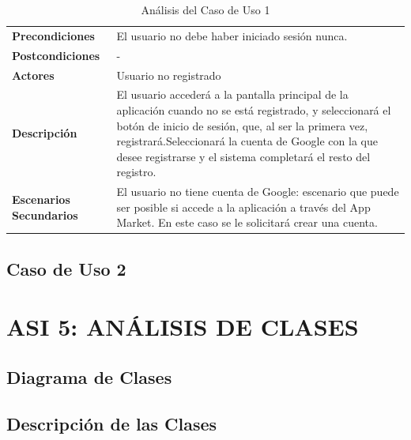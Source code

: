 \documentclass[11pt]{report}
\begin{document}
\begin{table}[H]
  \centering
  \vspace{-5mm}
  \caption{Análisis del Caso de Uso 1}
    \begin{tabular}{p{7.5em}p{24.145em}}
    \toprule
    \rowcolor[rgb]{ .871,  .918,  .965} \multicolumn{2}{p{31.645em}}{\textbf{Registro}} \\
    \midrule
    \rowcolor[rgb]{ .906,  .902,  .902} \textbf{Precondiciones} & \cellcolor[rgb]{ 1,  1,  1}El usuario no debe haber iniciado sesión nunca. \\
    \midrule
    \rowcolor[rgb]{ .906,  .902,  .902} \textbf{Postcondiciones} & \cellcolor[rgb]{ 1,  1,  1}- \\
    \midrule
    \rowcolor[rgb]{ .906,  .902,  .902} \textbf{Actores} & \cellcolor[rgb]{ 1,  1,  1}Usuario no registrado \\
    \midrule
    \rowcolor[rgb]{ .906,  .902,  .902} \textbf{Descripción} & \cellcolor[rgb]{ 1,  1,  1}El usuario accederá a la pantalla principal de la aplicación cuando no se está registrado, y seleccionará el botón de inicio de sesión, que, al ser la primera vez, registrará.Seleccionará la cuenta de Google con la que desee registrarse y el sistema completará el resto del registro. \\
    \midrule
    \rowcolor[rgb]{ .906,  .902,  .902} \textbf{Escenarios          Secundarios} & \cellcolor[rgb]{ 1,  1,  1} El usuario no tiene cuenta de Google: escenario que puede ser posible si accede a la aplicación a través del App Market. En este caso se le solicitará crear una cuenta. \\
    \bottomrule
    \end{tabular}%
\end{table}%
 
\subsection{Caso de Uso 2}


\newpage
\section{ASI 5: ANÁLISIS DE CLASES}

\subsection{Diagrama de Clases} 

\subsection{Descripción de las Clases}
\end{document}
